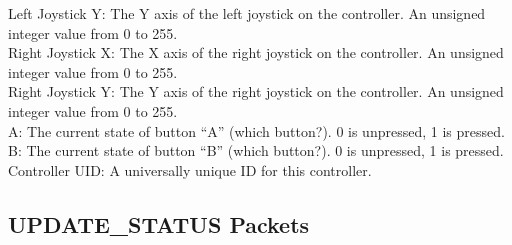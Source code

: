 \documentclass[11pt]{article}
\begin{document}
Left Joystick Y: The Y axis of the left joystick on the controller.  An unsigned integer value from 0 to 255.\\
Right Joystick X: The X axis of the right joystick on the controller.  An unsigned integer value from 0 to 255.\\
Right Joystick Y: The Y axis of the right joystick on the controller.  An unsigned integer value from 0 to 255.\\
A: The current state of button “A” (which button?).  0 is unpressed, 1 is pressed.\\
B: The current state of button “B” (which button?).  0 is unpressed, 1 is pressed.\\
Controller UID: A universally unique ID for this controller.

\subsection {UPDATE\_STATUS Packets}
\end{document}
